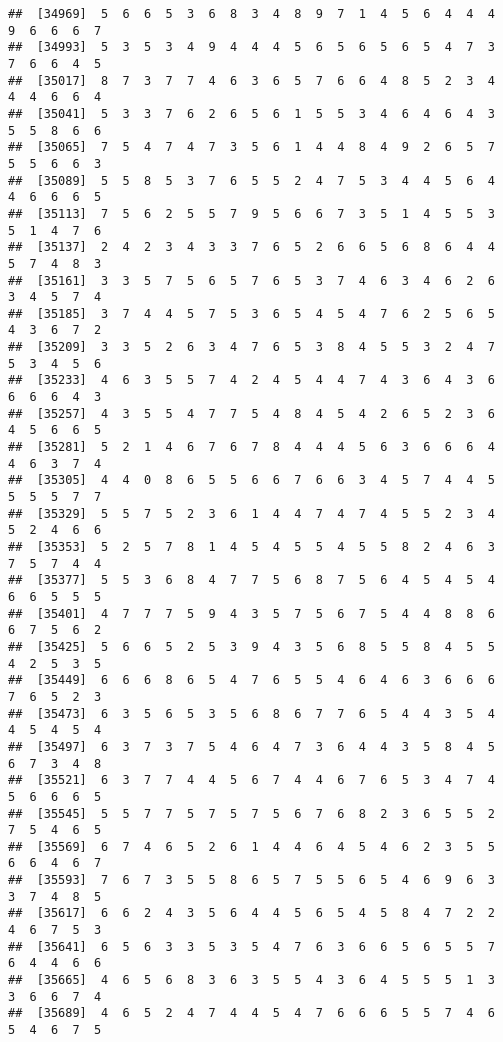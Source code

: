 \documentclass[
]{book}
\begin{document}
\begin{verbatim}
##  [34969]  5  6  6  5  3  6  8  3  4  8  9  7  1  4  5  6  4  4  4  9  6  6  6  7
##  [34993]  5  3  5  3  4  9  4  4  4  5  6  5  6  5  6  5  4  7  3  7  6  6  4  5
##  [35017]  8  7  3  7  7  4  6  3  6  5  7  6  6  4  8  5  2  3  4  4  4  6  6  4
##  [35041]  5  3  3  7  6  2  6  5  6  1  5  5  3  4  6  4  6  4  3  5  5  8  6  6
##  [35065]  7  5  4  7  4  7  3  5  6  1  4  4  8  4  9  2  6  5  7  5  5  6  6  3
##  [35089]  5  5  8  5  3  7  6  5  5  2  4  7  5  3  4  4  5  6  4  4  6  6  6  5
##  [35113]  7  5  6  2  5  5  7  9  5  6  6  7  3  5  1  4  5  5  3  5  1  4  7  6
##  [35137]  2  4  2  3  4  3  3  7  6  5  2  6  6  5  6  8  6  4  4  5  7  4  8  3
##  [35161]  3  3  5  7  5  6  5  7  6  5  3  7  4  6  3  4  6  2  6  3  4  5  7  4
##  [35185]  3  7  4  4  5  7  5  3  6  5  4  5  4  7  6  2  5  6  5  4  3  6  7  2
##  [35209]  3  3  5  2  6  3  4  7  6  5  3  8  4  5  5  3  2  4  7  5  3  4  5  6
##  [35233]  4  6  3  5  5  7  4  2  4  5  4  4  7  4  3  6  4  3  6  6  6  6  4  3
##  [35257]  4  3  5  5  4  7  7  5  4  8  4  5  4  2  6  5  2  3  6  4  5  6  6  5
##  [35281]  5  2  1  4  6  7  6  7  8  4  4  4  5  6  3  6  6  6  4  4  6  3  7  4
##  [35305]  4  4  0  8  6  5  5  6  6  7  6  6  3  4  5  7  4  4  5  5  5  5  7  7
##  [35329]  5  5  7  5  2  3  6  1  4  4  7  4  7  4  5  5  2  3  4  5  2  4  6  6
##  [35353]  5  2  5  7  8  1  4  5  4  5  5  4  5  5  8  2  4  6  3  7  5  7  4  4
##  [35377]  5  5  3  6  8  4  7  7  5  6  8  7  5  6  4  5  4  5  4  6  6  5  5  5
##  [35401]  4  7  7  7  5  9  4  3  5  7  5  6  7  5  4  4  8  8  6  6  7  5  6  2
##  [35425]  5  6  6  5  2  5  3  9  4  3  5  6  8  5  5  8  4  5  5  4  2  5  3  5
##  [35449]  6  6  6  8  6  5  4  7  6  5  5  4  6  4  6  3  6  6  6  7  6  5  2  3
##  [35473]  6  3  5  6  5  3  5  6  8  6  7  7  6  5  4  4  3  5  4  4  5  4  5  4
##  [35497]  6  3  7  3  7  5  4  6  4  7  3  6  4  4  3  5  8  4  5  6  7  3  4  8
##  [35521]  6  3  7  7  4  4  5  6  7  4  4  6  7  6  5  3  4  7  4  5  6  6  6  5
##  [35545]  5  5  7  7  5  7  5  7  5  6  7  6  8  2  3  6  5  5  2  7  5  4  6  5
##  [35569]  6  7  4  6  5  2  6  1  4  4  6  4  5  4  6  2  3  5  5  6  6  4  6  7
##  [35593]  7  6  7  3  5  5  8  6  5  7  5  5  6  5  4  6  9  6  3  3  7  4  8  5
##  [35617]  6  6  2  4  3  5  6  4  4  5  6  5  4  5  8  4  7  2  2  4  6  7  5  3
##  [35641]  6  5  6  3  3  5  3  5  4  7  6  3  6  6  5  6  5  5  7  6  4  4  6  6
##  [35665]  4  6  5  6  8  3  6  3  5  5  4  3  6  4  5  5  5  1  3  3  6  6  7  4
##  [35689]  4  6  5  2  4  7  4  4  5  4  7  6  6  6  5  5  7  4  6  5  4  6  7  5

\end{verbatim}
\end{document}

